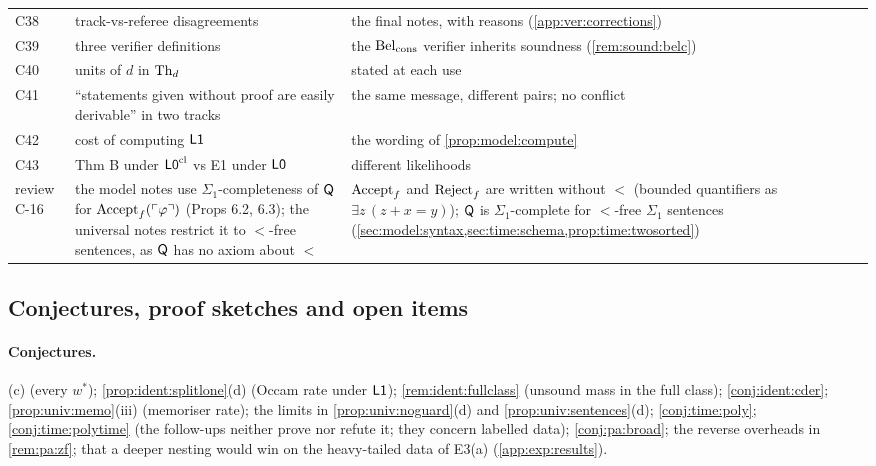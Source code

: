 {\begin{longtable}{@{}l>{\raggedright\arraybackslash}p{6.0cm}>{\raggedright\arraybackslash}p{7.7cm}@{}}
C38 & track-vs-referee disagreements & the final notes, with reasons (\cref{app:ver:corrections})\\
C39 & three verifier definitions & the $\mathrm{Bel}_{\mathrm{cons}}$ verifier inherits soundness (\cref{rem:sound:belc})\\
C40 & units of $d$ in $\mathrm{Th}_d$ & stated at each use\\
C41 & ``statements given without proof are easily derivable'' in two tracks & the same message, different pairs; no conflict\\
C42 & cost of computing $\mathord{\mathsf{L1}}$ & the wording of \cref{prop:model:compute}\\
C43 & Thm B under $\mathord{\mathsf{L0}}^{\mathrm{cl}}$ vs E1 under $\mathord{\mathsf{L0}}$ & different likelihoods\\
review C-16 & the model notes use $\Sigma_1$-completeness of $\mathsf{Q}$ for $\mathrm{Accept}_{f}(\ulcorner \varphi\urcorner)$ (Props 6.2, 6.3); the universal notes restrict it to $<$-free sentences, as $\mathsf{Q}$ has no axiom about $<$ & $\mathrm{Accept}_{f}$ and $\mathrm{Reject}_{f}$ are written without $<$ (bounded quantifiers as $\exists z\,(z+x=y)$); $\mathsf{Q}$ is $\Sigma_1$-complete for $<$-free $\Sigma_1$ sentences (\cref{sec:model:syntax,sec:time:schema,prop:time:twosorted})\\
\end{longtable}
}

\subsection{Conjectures, proof sketches and open items}\label{app:ver:sketches}

\paragraph{Conjectures.}
(c) (every $w^*$);
\cref{prop:ident:splitlone}(d) (Occam rate under $\mathord{\mathsf{L1}}$);
\cref{rem:ident:fullclass} (unsound mass in the full class);
\cref{conj:ident:cder};
\cref{prop:univ:memo}(iii) (memoriser rate);
the limits in \cref{prop:univ:noguard}(d) and \cref{prop:univ:sentences}(d);
\cref{conj:time:poly};
\cref{conj:time:polytime} (the follow-ups neither prove nor refute it; they concern labelled data);
\cref{conj:pa:broad};
the reverse overheads in \cref{rem:pa:zf};
that a deeper nesting would win on the heavy-tailed data of E3(a) (\cref{app:exp:results}).

